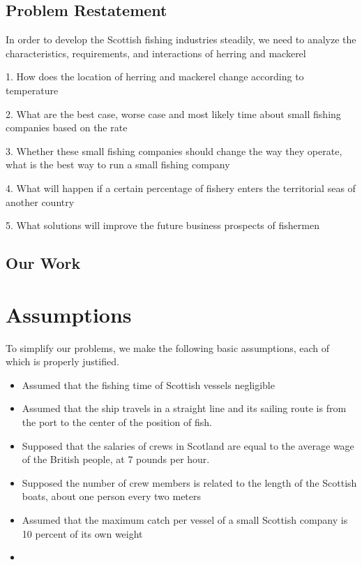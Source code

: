 \documentclass{mcmthesis}
\begin{document}
\subsection{Problem Restatement}
In order to develop the Scottish fishing industries steadily,   we need to analyze the characteristics, requirements, and interactions of herring and mackerel

1.    How does the location of herring and mackerel change according to temperature

2.    What are the best case, worse case and most likely time about  small fishing companies  based on the rate 


3.    Whether these small fishing companies should change the way they operate, what is the best way to run a small fishing company
 
4.    What will happen if a certain percentage of fishery enters the territorial seas of another country

5.    What solutions will improve the future business prospects of fishermen



\subsection{Our Work}


\section{Assumptions}
To simplify our problems, we make the following basic assumptions, each of which is properly justified.
\begin{itemize}
\item 
Assumed that the fishing time of Scottish vessels negligible
\item 
Assumed that the ship travels in a straight line and its sailing route is from the port to the center of the position of fish.
\item 
Supposed that the salaries of crews in Scotland are equal to the average wage of the British people, at 7 pounds per hour.
\item 
Supposed the number of crew members is related to the length of the Scottish boats, about one person every two meters
\item 
Assumed that the maximum catch per vessel of a small Scottish company is 10 percent of its own weight
\item 

\end{itemize}
\end{document}
